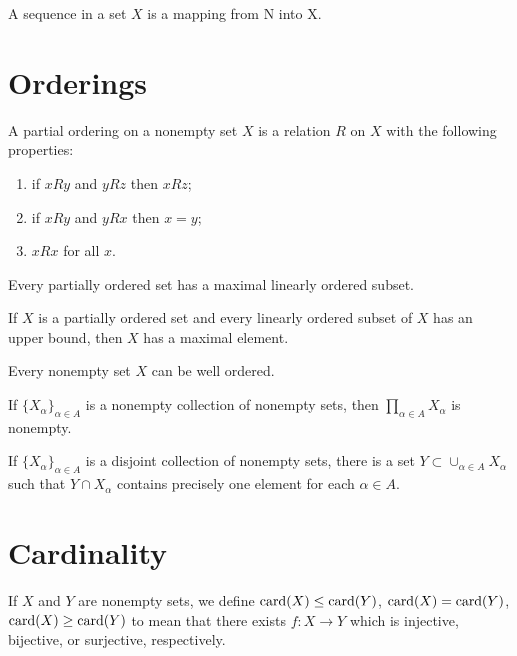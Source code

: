 A sequence in a set $X$ is a mapping from N into X.

\section{Orderings}

\begin{definition}
A partial ordering on a nonempty set $X$ is a relation $R$ on $X$ with the following properties:
\begin{enumerate}
    \item if $x R y$ and $y R z$ then $x R z$;
    \item if $x R y$ and $y R x$ then $x = y$;
    \item $x R x$ for all $x$.
\end{enumerate}
\end{definition}

\begin{theorem}
Every partially ordered set has a maximal linearly ordered subset.
\end{theorem}

\begin{lemma}
If $X$ is a partially ordered set and every linearly ordered subset of $X$ has an upper bound, then $X$ has a maximal element.
\end{lemma}

\begin{theorem}
Every nonempty set $X$ can be well ordered.
\end{theorem}

\begin{theorem}
If $\{ X_{\alpha} \}_{\alpha \in A}$ is a nonempty collection of nonempty sets, then $\prod_{\alpha \in A} X_{\alpha}$ is nonempty.
\end{theorem}

\begin{corollary}
If $\{ X_{\alpha} \}_{\alpha \in A}$ is a disjoint collection of nonempty sets, there is a set $Y \subset \cup_{\alpha \in A} X_{\alpha}$ such that $Y \cap X_{\alpha}$ contains precisely one element for each $\alpha \in A$.
\end{corollary}

\section{Cardinality}

\begin{definition}
If $X$ and $Y$ are nonempty sets, we define $\mathrm{card} (X) \le \mathrm{card} (Y)$, $\mathrm{card} (X) = \mathrm{card} (Y)$, $\mathrm{card} (X) \ge \mathrm{card} (Y)$ to mean that there exists $f: X \to Y$ which is injective, bijective, or surjective, respectively.
\end{definition}

